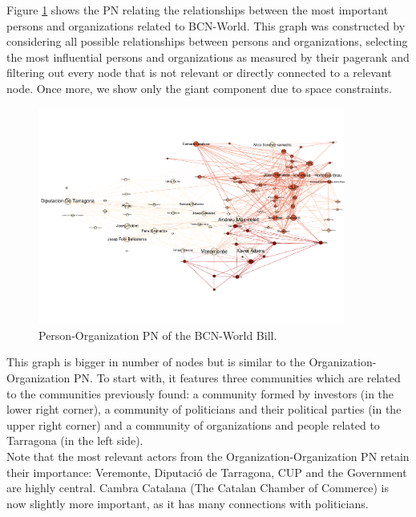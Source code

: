 Figure \ref{fig:00062014-organizations} shows the PN relating the relationships between the most important persons and organizations related to BCN-World. This graph was constructed by considering all possible relationships between persons and organizations, selecting the most influential persons and organizations as measured by their pagerank and filtering out every node that is not relevant or directly connected to a relevant node. Once more, we show only the giant component due to space constraints.\\

\begin{figure}[H]
    \centering
    \includegraphics[width=0.9\textwidth]{figs/00062014-person_organizations}
    \caption{Person-Organization PN of the BCN-World Bill.}
    \label{fig:00062014-organizations}
\end{figure}


This graph is bigger in number of nodes but is similar to the Organization-Organization PN. To start with, it features three communities which are related to the communities previously found: a community formed by investors (in the lower right corner), a community of politicians and their political parties (in the upper right corner) and a community of organizations and people related to Tarragona (in the left side). \\
Note that the most relevant actors from the Organization-Organization PN retain their importance: Veremonte, Diputaci\'o de Tarragona, CUP and the Government are highly central. Cambra Catalana (The Catalan Chamber of Commerce) is now slightly more important, as it has many connections with politicians. \\

